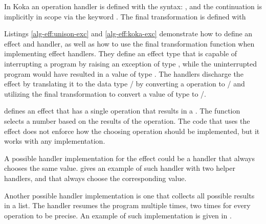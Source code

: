 

 In Koka an operation handler is defined with the syntax: , and the continuation is implicitly in scope via the keyword . The final transformation is defined with 



Listings \ref{alg-eff:unison-exc} and \ref{alg-eff:koka-exc} demonstrate how to define an effect and handler, as well as how to use the final transformation function when implementing effect handlers. They define an effect type  that is capable of interrupting a program by raising an exception of type , while the uninterrupted program would have resulted in a value of type . The handlers discharge the effect by translating it to the data type / by converting a  operation to / and utilizing the final transformation to convert a value of type  to /.



 defines an effect  that has a single operation  that results in a . The function  selects a number based on the results of the  operation. The code that uses the effect does not enforce how the choosing operation should be implemented, but it works with any implementation.

A possible handler implementation for the  effect could be a handler that always chooses the same  value.  gives an example of such handler with two helper handlers,  and  that always choose the corresponding value.



Another possible handler implementation is one that collects all possible results in a list.
The handler resumes the program multiple times, two times for every  operation to be precise. An example of such implementation is given in .

